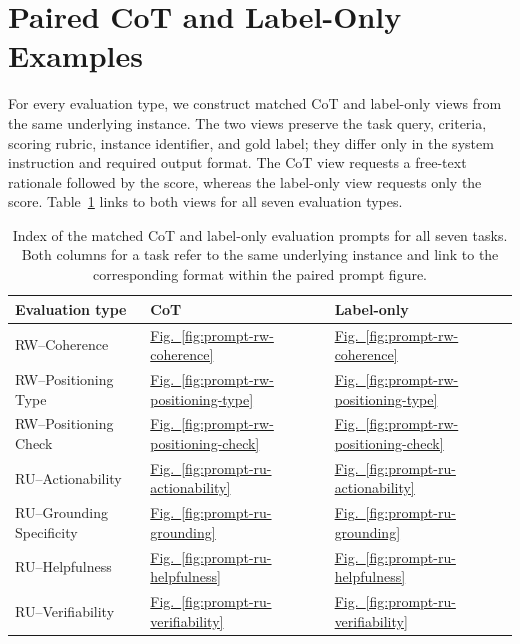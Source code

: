 \section{Paired CoT and Label-Only Examples}
\label{app:dataset-examples}

For every evaluation type, we construct matched CoT and label-only views from
the same underlying instance. The two views preserve the task query, criteria,
scoring rubric, instance identifier, and gold label; they differ only in the
system instruction and required output format. The CoT view requests a
free-text rationale followed by the score, whereas the label-only view requests
only the score. Table~\ref{tab:evaluation-prompt-index} links to both views for
all seven evaluation types. 

\begin{table}[H]
\centering
\small
\begin{tabular}{lll}
\hline
\textbf{Evaluation type} & \textbf{CoT} & \textbf{Label-only} \\
\hline
RW--Coherence &
\hyperlink{prompt-rw-coherence-cot}{Fig.~\ref*{fig:prompt-rw-coherence}} &
\hyperlink{prompt-rw-coherence-label-only}{Fig.~\ref*{fig:prompt-rw-coherence}} \\
RW--Positioning Type &
\hyperlink{prompt-rw-positioning-type-cot}{Fig.~\ref*{fig:prompt-rw-positioning-type}} &
\hyperlink{prompt-rw-positioning-type-label-only}{Fig.~\ref*{fig:prompt-rw-positioning-type}} \\
RW--Positioning Check &
\hyperlink{prompt-rw-positioning-check-cot}{Fig.~\ref*{fig:prompt-rw-positioning-check}} &
\hyperlink{prompt-rw-positioning-check-label-only}{Fig.~\ref*{fig:prompt-rw-positioning-check}} \\
RU--Actionability &
\hyperlink{prompt-ru-actionability-cot}{Fig.~\ref*{fig:prompt-ru-actionability}} &
\hyperlink{prompt-ru-actionability-label-only}{Fig.~\ref*{fig:prompt-ru-actionability}} \\
RU--Grounding Specificity &
\hyperlink{prompt-ru-grounding-cot}{Fig.~\ref*{fig:prompt-ru-grounding}} &
\hyperlink{prompt-ru-grounding-label-only}{Fig.~\ref*{fig:prompt-ru-grounding}} \\
RU--Helpfulness &
\hyperlink{prompt-ru-helpfulness-cot}{Fig.~\ref*{fig:prompt-ru-helpfulness}} &
\hyperlink{prompt-ru-helpfulness-label-only}{Fig.~\ref*{fig:prompt-ru-helpfulness}} \\
RU--Verifiability &
\hyperlink{prompt-ru-verifiability-cot}{Fig.~\ref*{fig:prompt-ru-verifiability}} &
\hyperlink{prompt-ru-verifiability-label-only}{Fig.~\ref*{fig:prompt-ru-verifiability}} \\
\hline
\end{tabular}
\caption{Index of the matched CoT and label-only evaluation prompts for all
seven tasks. Both columns for a task refer to the same underlying instance and
link to the corresponding format within the paired prompt figure.}
\label{tab:evaluation-prompt-index}
\end{table}

